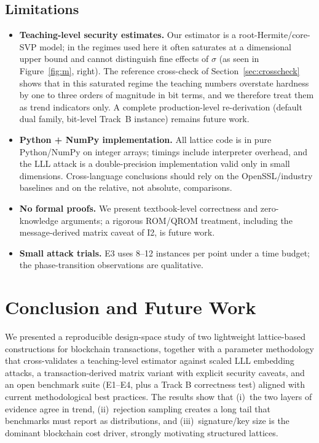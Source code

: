 \documentclass[11pt]{article}
\begin{document}
\subsection{Limitations}
\begin{itemize}
\item \textbf{Teaching-level security estimates.} Our estimator is a
  root-Hermite/core-SVP model; in the regimes used here it often saturates at a
  dimensional upper bound and cannot distinguish fine effects of $\sigma$ (as
  seen in Figure~\ref{fig:m}, right).  The reference cross-check of
  Section~\ref{sec:crosscheck} shows that in this saturated regime the
  teaching numbers overstate hardness by one to three orders of magnitude in
  bit terms, and we therefore treat them as trend indicators only.  A complete
  production-level re-derivation (default dual family, bit-level Track~B
  instance) remains future work.
\item \textbf{Python + NumPy implementation.} All lattice code is in pure
  Python/NumPy on integer arrays; timings include interpreter overhead, and the
  LLL attack is a double-precision implementation valid only in small
  dimensions.  Cross-language conclusions should rely on the OpenSSL/industry
  baselines and on the relative, not absolute, comparisons.
\item \textbf{No formal proofs.} We present textbook-level correctness and
  zero-knowledge arguments; a rigorous ROM/QROM treatment, including the
  message-derived matrix caveat of I2, is future work.
\item \textbf{Small attack trials.} E3 uses 8--12 instances per point under a
  time budget; the phase-transition observations are qualitative.
\end{itemize}

\section{Conclusion and Future Work}\label{sec:concl}

We presented a reproducible design-space study of two lightweight lattice-based
constructions for blockchain transactions, together with a parameter
methodology that cross-validates a teaching-level estimator against scaled LLL
embedding attacks, a transaction-derived matrix variant with explicit security
caveats, and an open benchmark suite (E1--E4, plus a Track B correctness test) aligned with current
methodological best practices.  The results show that (i)~the two layers of
evidence agree in trend, (ii)~rejection sampling creates a long tail that
benchmarks must report as distributions, and (iii)~signature/key size is the
dominant blockchain cost driver, strongly motivating structured lattices.
\end{document}
